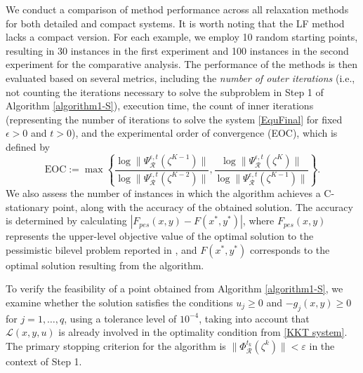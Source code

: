 We conduct a comparison of method performance across all relaxation methods for both detailed and compact systems. It is worth noting that the LF method lacks a compact version. For each example, we employ 10 random starting points, resulting in 30 instances in the first experiment and 100 instances in the second experiment for the comparative analysis. The performance of the methods is then evaluated based on several metrics, including the \textit{number of outer iterations} (i.e., not counting the iterations necessary to   {solve} the subproblem in Step 1 of Algorithm \ref{algorithm1-S}), execution time, the count of inner iterations (representing the number of iterations to solve the system \eqref{EquFinal} for fixed $\epsilon >0$ and $t>0$), and the experimental order of convergence (EOC), which is defined by 
\[
\text{EOC}  := \max \left\{ \frac{\log\|\Psi^{\epsilon,t}_{\mathcal{R}}(\zeta^{K-1})\|}{\log\|\Psi^{\epsilon,t}_{\mathcal{R}}(\zeta^{K-2})\|}, \frac{\log\|\Psi^{\epsilon,t}_{\mathcal{R}}(\zeta^{K})\|}{\log\|\Psi^{\epsilon,t}_{\mathcal{R}}(\zeta^{K-1})\|} \right\}.
\]
We also assess the number of instances in which the algorithm achieves a C-stationary point, along with the accuracy of the obtained solution. The accuracy is  determined by calculating $|F_{pes}(x, y) - F(x^*, y^*)|$, where $F_{pes}(x, y)$ represents the upper-level objective value of the optimal solution to the pessimistic bilevel problem reported in \cite{WiesemannTsoukalasKleniatiRustem2013}, and $F(x^*, y^*)$ corresponds to the optimal solution resulting from the algorithm. %

To verify the feasibility of a point obtained from Algorithm \ref{algorithm1-S}, we examine whether the solution satisfies the conditions $u_j \geq 0$ and $-g_j(x, y) \geq 0$ for $j=1, \dots, q$, using a tolerance level of $10^{-4}$, taking into account that $\mathcal{L}(x, y, u)$ is already involved  in the optimality condition from \eqref{KKT system}. The primary stopping criterion for the algorithm is $\|\Phi^{t_k}_{\mathcal{R}}(\zeta^k)\| < \varepsilon$ in the context of Step 1. 

